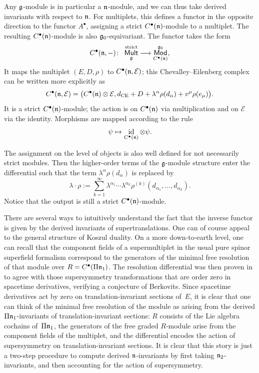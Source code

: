 \documentclass[11pt]{article}
\numberwithin{equation}{section}
\numberwithin{equation}{section}
\def\cE{\mathcal E}\def\cF{\mathcal F}\def\cG{\mathcal G}\def\cH{\mathcal H}
\def\cat#1{\ensuremath{\mathsf{#1}}}
\DeclareMathOperator{\Mod}{\cat{Mod}}
\DeclareMathOperator{\Mult}{\cat{Mult}}
\def\bu{\bullet}
\def\d{{\rm d}}
\DeclareMathOperator{\id}{id}
\begin{document}
Any $\mathfrak g$-module is in particular a $\mathfrak n$-module, and we can thus take derived invariants with respect to $\mathfrak n$. For multiplets, this defines a functor in the opposite direction to the functor $A^\bullet$, assigning a strict $C^\bullet(\mathfrak n)$-module to a multiplet. The resulting $C^\bullet(\mathfrak n)$-module is also $\mathfrak g_0$-equivariant.
The functor takes the form
\begin{equation*}
C^\bullet(\fn , -) \colon \ \Mult_{\fg}^{\mathrm{strict}} \longrightarrow \Mod^{\fg_0}_{C^\bullet(\fn)},
\end{equation*}
It maps the multiplet	$(E,D,\rho)$ to $C^\bullet(\fn , \cE)$; this Chevalley--Eilenberg complex can be written more explicitly as
\begin{equation*}
C^\bullet(\fn , \cE) = \big( C^\bullet(\fn) \otimes \cE , \d_{\mathrm{CE}} + D + \lambda^\alpha \rho(d_\alpha) + v^\mu \rho(e_\mu) \big) .
\end{equation*}
It is a strict $C^\bullet(\mathfrak n)$-module; the action is on $C^\bullet(\mathfrak n)$ via multiplication and on $\cE$ via the identity. Morphisms are mapped according to the rule
\begin{equation*}
\psi \mapsto
\id_{C^\bullet(\fn)} \otimes \psi .
\end{equation*}

\begin{rmk}
	The assignment on the level of objects is also well defined for not necessarily strict modules. Then the higher-order terms of the $\mathfrak g$-module structure enter the differential such that the term $\lambda^\alpha \rho(d_\alpha)$ is replaced by
	\begin{equation*}
	\lambda \cdot \rho := \sum_{k=1}^{\infty} \lambda^{\alpha_1} \cdots \lambda^{\alpha_k} \rho^{(k)}(d_{\alpha_1} , \dots , d_{\alpha_k}).
	\end{equation*}
	Notice that the output is still a strict $C^\bullet(\mathfrak n)$-module.
\end{rmk}
There are several ways to intuitively understand the fact that the inverse functor is given by the derived invariants of supertranslations. One can of course appeal to the general structure of Koszul duality. On a more down-to-earth level, one can recall that the component fields of a supermultiplet in the usual pure spinor superfield formalism correspond to the generators of the minimal free resolution of that module over $R = C^\bu(\Pi \fn_1)$. The resolution differential was then proven in~\cite{perspectives} to agree with those supersymmetry transformations that are order zero in spacetime derivatives, verifying a conjecture of Berkovits. Since spacetime derivatives act by zero on translation-invariant sections of~$E$, it is clear that one can think of the minimal free resolution of the module as arising from the derived $\Pi \mathfrak n_1$-invariants of translation-invariant sections: $R$ consists of the Lie algebra cochains of~$\Pi \mathfrak n_1$, the generators of the free graded $R$-module arise from the component fields of the multiplet, and the differential encodes the action of supersymmetry on translation-invariant sections. It is clear that this story is just a two-step procedure to compute derived $\mathfrak n$-invariants by first taking $\mathfrak n_2$-invariants, and then accounting for the action of supersymmetry.
\end{document}
